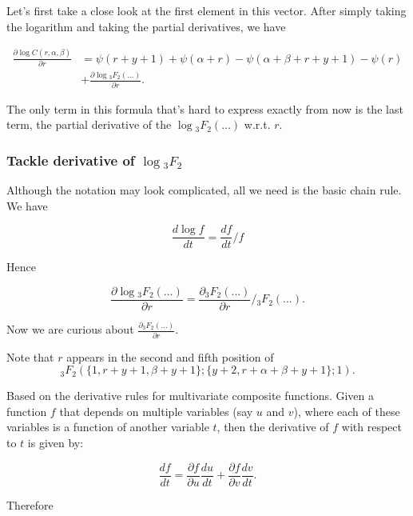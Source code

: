 \documentclass[11pt]{article}
\begin{document}
Let's first take a close look at the first element in this vector. After simply taking the logarithm and taking the partial derivatives, we have

\begin{equation}
\begin{aligned}
\frac{\partial \log C(r,\alpha,\beta)}{\partial r} &= \psi(r+y+1) + \psi(\alpha+r) - \psi(\alpha+\beta+r+y+1) - \psi(r) \\
&+ \frac{\partial \log {}_3F_2(...)}{\partial r}.
\end{aligned}
\end{equation}

The only term in this formula that's hard to express exactly from now is the last term, the partial derivative of the $\log {}_3F_2(...)$ w.r.t. $r$.

\subsubsection*{Tackle derivative of $\log {}_3F_2$}
Although the notation may look complicated, all we need is the basic chain rule. We have

\begin{equation}
	\frac{d \log f}{dt} = \frac{df}{dt} / f
\end{equation}

Hence

\begin{equation}
	\frac{\partial \log {}_3F_2(...)}{\partial r} =  \frac{\partial {}_3F_2(...)}{\partial r} /  {}_3F_2(...).
\end{equation}

Now we are curious about $\frac{\partial {}_3F_2(...)}{\partial r}$.

Note that $r$ appears in the second and fifth position of $${}_3F_2(\{1,r+y +1,\beta +y +1\}; \{y +2,r+\alpha +\beta +y +1\};1).$$ 

Based on the derivative rules for multivariate composite functions. Given a function \( f \) that depends on multiple variables (say \( u \) and \( v \)), where each of these variables is a function of another variable \( t \), then the derivative of \( f \) with respect to \( t \) is given by:

\begin{equation}
	\frac{df}{dt} = \frac{\partial f}{\partial u} \frac{du}{dt} + \frac{\partial f}{\partial v} \frac{dv}{dt}.
\end{equation}

Therefore
\end{document}
